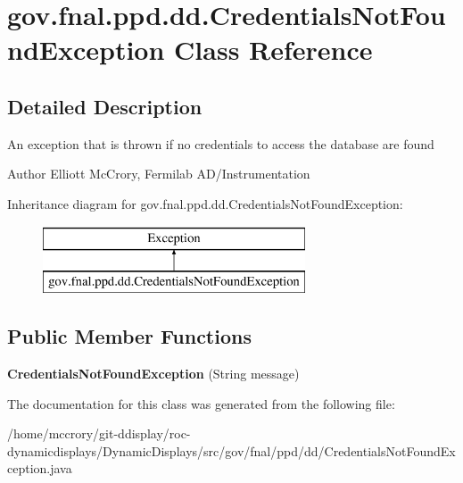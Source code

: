 \hypertarget{classgov_1_1fnal_1_1ppd_1_1dd_1_1CredentialsNotFoundException}{\section{gov.\-fnal.\-ppd.\-dd.\-Credentials\-Not\-Found\-Exception Class Reference}
\label{classgov_1_1fnal_1_1ppd_1_1dd_1_1CredentialsNotFoundException}
}


\subsection{Detailed Description}
An exception that is thrown if no credentials to access the database are found

\begin{DoxyAuthor}{Author}
Elliott Mc\-Crory, Fermilab A\-D/\-Instrumentation 
\end{DoxyAuthor}
Inheritance diagram for gov.\-fnal.\-ppd.\-dd.\-Credentials\-Not\-Found\-Exception\-:\begin{figure}[H]
\begin{center}
\leavevmode
\includegraphics[height=2.000000cm]{classgov_1_1fnal_1_1ppd_1_1dd_1_1CredentialsNotFoundException}
\end{center}
\end{figure}
\subsection*{Public Member Functions}
\begin{DoxyCompactItemize}
\item 
\hypertarget{classgov_1_1fnal_1_1ppd_1_1dd_1_1CredentialsNotFoundException_a3ad6d4567462d260cb411d384065d12c}{{\bfseries Credentials\-Not\-Found\-Exception} (String message)}\label{classgov_1_1fnal_1_1ppd_1_1dd_1_1CredentialsNotFoundException_a3ad6d4567462d260cb411d384065d12c}

\end{DoxyCompactItemize}


The documentation for this class was generated from the following file\-:\begin{DoxyCompactItemize}
\item 
/home/mccrory/git-\/ddisplay/roc-\/dynamicdisplays/\-Dynamic\-Displays/src/gov/fnal/ppd/dd/Credentials\-Not\-Found\-Exception.\-java\end{DoxyCompactItemize}

